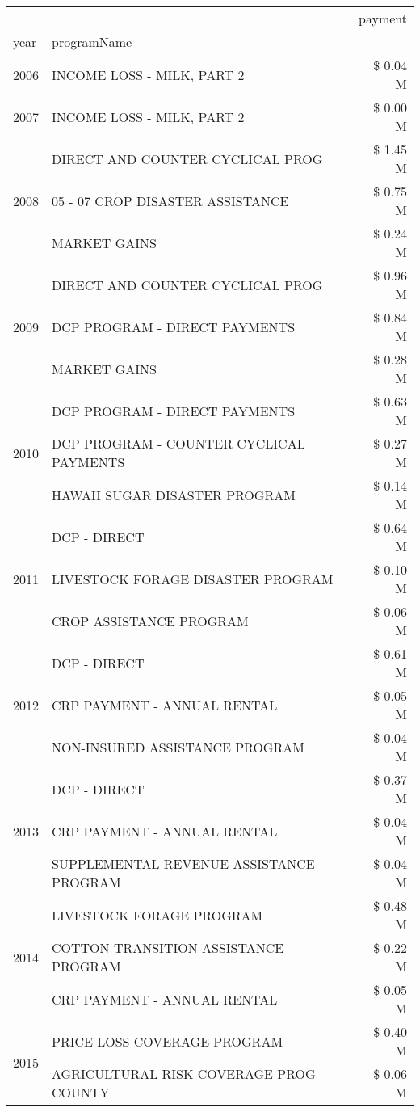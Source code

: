 \begin{tabular}{llr}
\toprule
 &  & payment \\
year & programName &  \\
\midrule
2006 & INCOME LOSS - MILK, PART 2 & \$ 0.04 M \\
\cline{1-3}
2007 & INCOME LOSS - MILK, PART 2 & \$ 0.00 M \\
\cline{1-3}
\multirow[t]{3}{*}{2008} & DIRECT AND COUNTER CYCLICAL PROG & \$ 1.45 M \\
 & 05 - 07 CROP DISASTER ASSISTANCE & \$ 0.75 M \\
 & MARKET GAINS & \$ 0.24 M \\
\cline{1-3}
\multirow[t]{3}{*}{2009} & DIRECT AND COUNTER CYCLICAL PROG & \$ 0.96 M \\
 & DCP PROGRAM - DIRECT PAYMENTS & \$ 0.84 M \\
 & MARKET GAINS & \$ 0.28 M \\
\cline{1-3}
\multirow[t]{3}{*}{2010} & DCP PROGRAM - DIRECT PAYMENTS & \$ 0.63 M \\
 & DCP PROGRAM - COUNTER CYCLICAL PAYMENTS & \$ 0.27 M \\
 & HAWAII SUGAR DISASTER PROGRAM & \$ 0.14 M \\
\cline{1-3}
\multirow[t]{3}{*}{2011} & DCP - DIRECT & \$ 0.64 M \\
 & LIVESTOCK FORAGE DISASTER PROGRAM & \$ 0.10 M \\
 & CROP ASSISTANCE PROGRAM & \$ 0.06 M \\
\cline{1-3}
\multirow[t]{3}{*}{2012} & DCP - DIRECT & \$ 0.61 M \\
 & CRP PAYMENT - ANNUAL RENTAL & \$ 0.05 M \\
 & NON-INSURED ASSISTANCE PROGRAM & \$ 0.04 M \\
\cline{1-3}
\multirow[t]{3}{*}{2013} & DCP - DIRECT & \$ 0.37 M \\
 & CRP PAYMENT - ANNUAL RENTAL & \$ 0.04 M \\
 & SUPPLEMENTAL REVENUE ASSISTANCE PROGRAM & \$ 0.04 M \\
\cline{1-3}
\multirow[t]{3}{*}{2014} & LIVESTOCK FORAGE PROGRAM & \$ 0.48 M \\
 & COTTON TRANSITION ASSISTANCE PROGRAM & \$ 0.22 M \\
 & CRP PAYMENT - ANNUAL RENTAL & \$ 0.05 M \\
\cline{1-3}
\multirow[t]{3}{*}{2015} & PRICE LOSS COVERAGE PROGRAM & \$ 0.40 M \\
 & AGRICULTURAL RISK COVERAGE PROG - COUNTY & \$ 0.06 M \\

\end{tabular}
